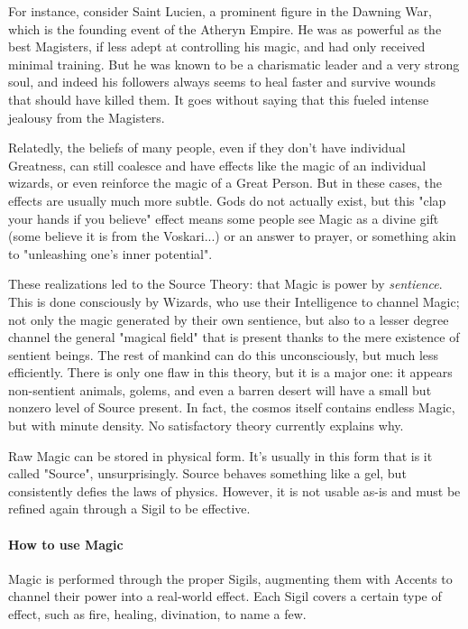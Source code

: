 For instance, consider Saint Lucien, a prominent figure in the Dawning War, which is the founding event of the Atheryn Empire. He was as powerful as the best Magisters, if less adept at controlling his magic, and had only received minimal training. But he was known to be a charismatic leader and a very strong soul, and indeed his followers always seems to heal faster and survive wounds that should have killed them. It goes without saying that this fueled intense jealousy from the Magisters.

Relatedly, the beliefs of many people, even if they don't have individual Greatness, can still coalesce and have effects like the magic of an individual wizards, or even reinforce the magic of a Great Person. But in these cases, the effects are usually much more subtle. Gods do not actually exist, but this "clap your hands if you believe" effect means some people see Magic as a divine gift (some believe it is from the Voskari...) or an answer to prayer, or something akin to "unleashing one's inner potential".
	
These realizations led to the Source Theory: that Magic is power by \textit{sentience}. This is done consciously by Wizards, who use their Intelligence to channel Magic; not only the magic generated by their own sentience, but also to a lesser degree channel the general "magical field" that is present thanks to the mere existence of sentient beings. The rest of mankind can do this unconsciously, but much less efficiently. There is only one flaw in this theory, but it is a major one: it appears non-sentient animals, golems, and even a barren desert will have a small but nonzero level of Source present. In fact, the cosmos itself contains endless Magic, but with minute density. No satisfactory theory currently explains why.

Raw Magic can be stored in physical form. It's usually in this form that is it called "Source", unsurprisingly. Source behaves something like a gel, but consistently defies the laws of physics. However, it is not usable as-is and must be refined again through a Sigil to be effective.



\paragraph{How to use Magic}

Magic is performed through the proper Sigils, augmenting them with Accents to channel their power into a real-world effect. Each Sigil covers a certain type of effect, such as fire, healing, divination, to name a few.

